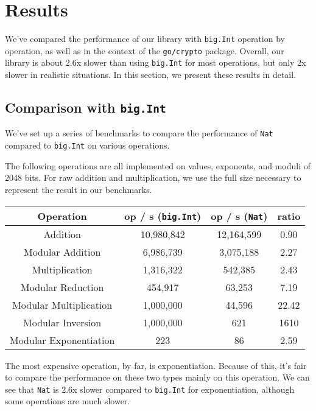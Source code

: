 \documentclass[11pt, a4paper]{article} %
\begin{document}
{\section{Results}

We've compared the performance of our library
with \texttt{big.Int} operation by operation, as well as in the
context of the \texttt{go/crypto} package.
Overall, our library is about 2.6x slower than using
\texttt{big.Int} for most operations,
but only 2x slower in realistic situations.
In this section, we
present these results in detail.

\subsection{Comparison with \texttt{big.Int}}

We've set up a series of benchmarks to compare the performance
of \texttt{Nat} compared to \texttt{big.Int} on various operations.

The following operations are all implemented on values, exponents,
and moduli of 2048 bits. For raw addition and multiplication,
we use the full size necessary to represent the result in our benchmarks.

\begin{center}
 \begin{tabular}{|c | c | c | c|} 
 \hline
 Operation & op / s (\texttt{big.Int}) & op / s (\texttt{Nat}) & ratio \\ [0.5ex] 
 \hline\hline
 Addition & 10,980,842 & 12,164,599 & 0.90 \\
 \hline
 Modular Addition & 6,986,739 & 3,075,188 & 2.27 \\
 \hline
 Multiplication & 1,316,322 & 542,385 & 2.43 \\
 \hline
 Modular Reduction & 454,917 & 63,253 & 7.19 \\
 \hline
 Modular Multiplication & 1,000,000 & 44,596 & 22.42 \\
 \hline
 Modular Inversion & 1,000,000 & 621 & 1610 \\
 \hline
 Modular Exponentiation & 223 & 86 & 2.59 \\
 \hline
\end{tabular}
\end{center}

The most expensive operation, by far, is exponentiation. Because
of this, it's fair to compare the performance on these two types
mainly on this operation. We can see that \texttt{Nat} is 2.6x slower
compared to \texttt{big.Int} for exponentiation, although
some operations are much slower.

}
\end{document}

